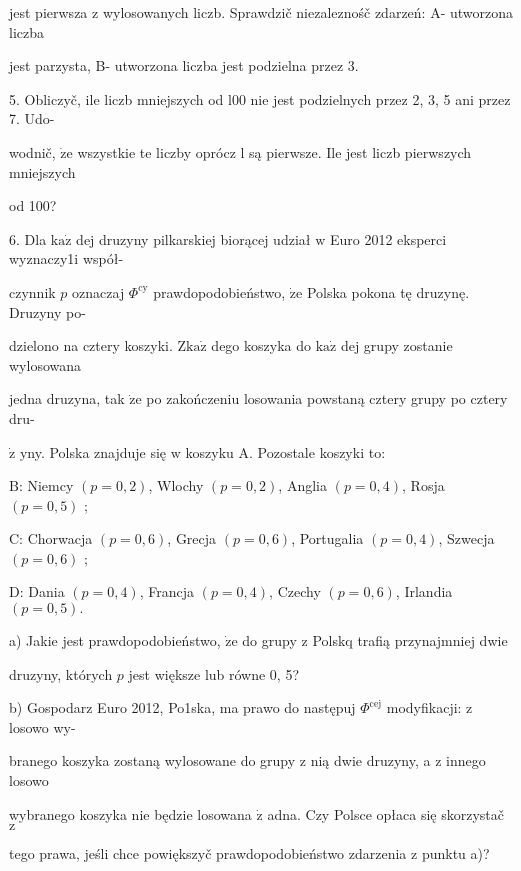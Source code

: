 \documentclass[a4paper,12pt]{article}
\begin{document}
jest pierwsza $\mathrm{z}$ wylosowanych liczb. Sprawdzič niezaleznośč zdarzeń: A- utworzona liczba

jest parzysta, B- utworzona liczba jest podzielna przez 3.

5. Obliczyč, ile liczb mniejszych od l00 nie jest podzielnych przez 2, 3, 5 ani przez 7. Udo-

wodnič, $\dot{\mathrm{z}}\mathrm{e}$ wszystkie te liczby oprócz l są pierwsze. Ile jest liczb pierwszych mniejszych

od 100?

6. Dla $\mathrm{k}\mathrm{a}\dot{\mathrm{z}}$ dej druzyny pilkarskiej biorącej udział $\mathrm{w}$ Euro 2012 eksperci wyznaczy1i współ-

czynnik $p$ oznaczaj $\Phi^{\mathrm{c}\mathrm{y}}$ prawdopodobieństwo, $\dot{\mathrm{z}}\mathrm{e}$ Polska pokona tę druzynę. Druzyny po-

dzielono na cztery koszyki. $\mathrm{Z} \mathrm{k}\mathrm{a}\dot{\mathrm{z}}$ dego koszyka do $\mathrm{k}\mathrm{a}\dot{\mathrm{z}}$ dej grupy zostanie wylosowana

jedna druzyna, tak $\dot{\mathrm{z}}\mathrm{e}$ po zakończeniu losowania powstaną cztery grupy po cztery dru-

$\dot{\mathrm{z}}$ yny. Polska znajduje się $\mathrm{w}$ koszyku A. Pozostale koszyki to:

$\mathrm{B}$: Niemcy $(p=0,2)$, Wlochy $(p=0,2)$, Anglia $(p=0,4)$, Rosja $(p=0,5)$ ;

$\mathrm{C}$: Chorwacja $(p=0,6)$, Grecja $(p=0,6)$, Portugalia $(p=0,4)$, Szwecja $(p=0,6)$ ;

$\mathrm{D}$: Dania $(p=0,4)$, Francja $(p=0,4)$, Czechy $(p=0,6)$, Irlandia $(p=0,5).$

a) Jakie jest prawdopodobieństwo, $\dot{\mathrm{z}}\mathrm{e}$ do grupy $\mathrm{z}$ Polskq trafią przynajmniej dwie

druzyny, których $p$ jest większe lub równe 0, 5?

b) Gospodarz Euro 2012, Po1ska, ma prawo do następuj $\Phi^{\mathrm{c}\mathrm{e}\mathrm{j}}$ modyfikacji: $\mathrm{z}$ losowo wy-

branego koszyka zostaną wylosowane do grupy $\mathrm{z}$ nią dwie druzyny, a $\mathrm{z}$ innego losowo

wybranego koszyka nie będzie losowana $\dot{\mathrm{z}}$ adna. Czy Polsce opłaca się skorzystač $\mathrm{z}$

tego prawa, jeśli chce powiększyč prawdopodobieństwo zdarzenia $\mathrm{z}$ punktu a)?
\end{document}
